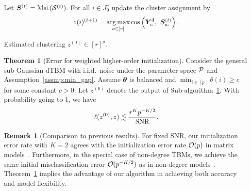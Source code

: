 \documentclass[lettersize,onecolumn,journal]{IEEEtran}
\theoremstyle{definition}
\newtheorem{thm}{Theorem}
\theoremstyle{definition}
\newtheorem{rmk}{Remark}
\newcommand{\of}[1]{\left(#1\right)}
\def\fixme#1#2{\textbf{\color{red}[FIXME (#1): #2]}}
\begin{document}
\begin{algorithm}[h!]
\begin{algorithmic}[1]
\State Let $\bm S^{(t)} = \text{Mat}(\mathcal{S}^{(t)})$. For all $i \in J_0^c$ update the cluster assignment by
\begin{equation}
    z(i)^{(t+1)} = \operatorname*{arg\,max}_{a \in [r]} \cos \left( \bm Y^{\text{d}}_{i:},\ \bm S^{(t)}_{a:} \right).
\end{equation}

\EndFor

\OUTPUT Estimated clustering $z^{(T)}  \in [r]^{p}$.

\end{algorithmic}
\end{algorithm}


\begin{thm}[Error for weighted higher-order initialization]\label{thm:initial} Consider the general {\color{blue} sub-Gaussian} dTBM {\color{blue} with i.i.d.\ noise} under the parameter space $\mathcal{P}$ and Assumption~\ref{assmp:min_gap}. 
Assume $\boldsymbol{\theta}$ is balanced and $\min_{i\in[p]}\theta(i) \geq c$ for some constant $c>0$. Let $ z^{(0)}$ denote the output of Sub-algorithm~\hyperref[alg:main]{1}. With probability going to 1, we have
\begin{equation}\label{eq:ini}
   \ell(z^{(0)}, z) \lesssim {r^K p^{-K/2}\over \text{SNR}}. 
\end{equation}
\end{thm}

\begin{rmk}[Comparison to previous results] For fixed SNR, our initialization error rate with $K=2$ agrees with the initialization error rate $\mathcal{O}(p)$ in matrix models~\citep{gao2018community}. Furthermore, in the special case of non-degree TBMs, we achieve the same initial misclassification error $\mathcal{O}(p^{-K/2})$ as in non-degree models~\citep{han2020exact}. Theorem~\ref{thm:initial} implies the advantage of our algorithm in achieving both accuracy and model flexibility. 
\end{rmk}
\end{document}
